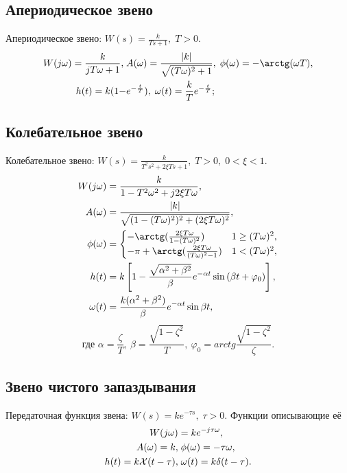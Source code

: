 \documentclass[../../TAU.tex]{subfiles}
\begin{document}
\subsection{Апериодическое звено} %
    Апериодическое звено: $W(s) = \frac{k}{Ts+1},\; T>0$.
    $$
        \begin{aligned}
            W(j\omega) = \frac{k}{jT\omega+1},\; &A(\omega) = \frac{|k|}{\sqrt{(T\omega)^2+1}},\; \phi(\omega) = -\arctg(\omega T),\\ h(t) = k(1-&e^{-\frac{t}{T}}),\; \omega(t) = \frac{k}{T}e^{-\frac{t}{T}};
        \end{aligned}
    $$
\subsection{Колебательное звено} %
    Колебательное звено: $W(s) = \frac{k}{T^2s^2+2\xi Ts+1},\; T>0,\; 0 < \xi < 1.$
    $$
        \begin{aligned}
            W(j\omega) &= \frac{k}{1-T^2\omega^2 +j2\xi T\omega},\\
            A(\omega) &= \frac{|k|}{\sqrt{(1-(T\omega)^2)^2 + (2\xi T\omega)^2}},\\
            \phi(\omega) &=
            \begin{cases}
                -\arctg(\frac{2\xi T\omega}{1-(T\omega)^2}) & 1 \ge (T\omega)^2,\\
                -\pi+\arctg(\frac{2\xi T\omega}{(T\omega)^2-1}) & 1 < (T\omega)^2,
            \end{cases}\\
            h(t) &= k\left[1-\frac{\sqrt{\alpha^2+\beta^2}}{\beta} e^{-\alpha t} \sin{(\beta t+\varphi_0)}\right],\\
            \omega(t) &= \frac{k (\alpha^2 + \beta^2)}{\beta} e^{-\alpha t} \sin{\beta  t},
        \end{aligned}
    $$
    $$
        \text{где } \alpha = \frac{\zeta}{T},\ \beta=\frac{\sqrt{1-\zeta^2}}{T},\ \varphi_0=arctg{\frac{\sqrt{1-\zeta^2}}{\zeta}}.
    $$
\subsection{Звено чистого запаздывания} %

    Передаточная функция звена: $W(s) = ke^{-\tau s},\; \tau > 0$. Функции описывающие её
    $$
        \begin{aligned}
            W(j\omega) &= ke^{-j\tau\omega},\\
            A(\omega) = k,&\; \phi(\omega) = -\tau\omega,\\
            h(t) = k\mathcal{X}(t-\tau),&\; \omega(t) = k\delta(t-\tau).
        \end{aligned}
    $$
\end{document}
